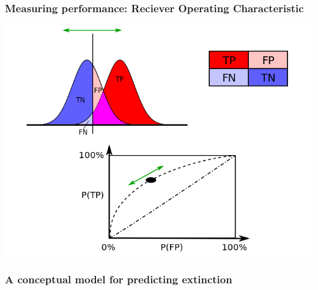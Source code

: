 \documentclass{beamer}
\begin{document}
\begin{frame}
  \frametitle{Measuring performance: Reciever Operating Characteristic}
  
  \begin{center}
    \includegraphics[width=\textwidth,height=0.8\textheight,keepaspectratio=true]{figure/wiki_709px-ROC_curves}
  \end{center}
  
  


  
\end{frame}


\begin{frame}
  \frametitle{A conceptual model for predicting extinction}

\end{frame}
\end{document}
